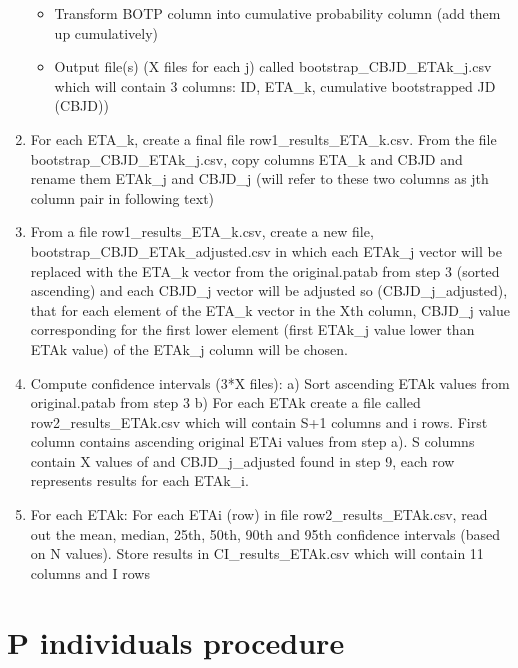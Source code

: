 \documentclass[a4paper,12pt]{article}
\begin{document}
\begin{enumerate}
\begin{itemize}
	\item Transform BOTP column into cumulative probability column (add them up cumulatively)
	\item Output file(s) (X files for each j) called bootstrap\_CBJD\_ETAk\_j.csv which will contain 3 	columns: ID, ETA\_k, cumulative bootstrapped JD (CBJD))
\end{itemize}
\item For each ETA\_k, create a final file row1\_results\_ETA\_k.csv. From the file bootstrap\_CBJD\_ETAk\_j.csv, copy columns ETA\_k and CBJD and rename them ETAk\_j and CBJD\_j (will refer to these two columns as jth column pair in following text)
\item From a file row1\_results\_ETA\_k.csv, create a new file, bootstrap\_CBJD\_ETAk\_adjusted.csv in which each ETAk\_j vector will be replaced with the ETA\_k vector from the original.patab from step 3 (sorted ascending) and each CBJD\_j vector will be adjusted so (CBJD\_j\_adjusted), that for each element of the ETA\_k vector in the Xth column, CBJD\_j value corresponding for the first lower element (first ETAk\_j value lower than ETAk value) of the ETAk\_j column will be chosen. 
\item Compute confidence intervals (3*X files): a) Sort ascending ETAk values from original.patab from step 3 b) For each ETAk create a file called row2\_results\_ETAk.csv which will contain S+1 columns and i rows. First column contains ascending original ETAi values from step a). S columns contain X values of and CBJD\_j\_adjusted found in step 9, each row represents results for each ETAk\_i.
\item For each ETAk: For each ETAi (row) in file row2\_results\_ETAk.csv, read out the mean, median, 25th, 50th, 90th and 95th confidence intervals (based on N values). Store results in CI\_results\_ETAk.csv which will contain 11 columns and I rows
\end{enumerate}

\section{P individuals procedure}
\end{document}
